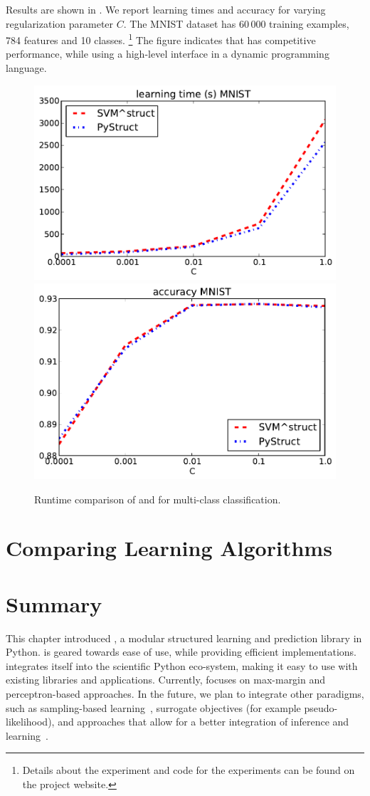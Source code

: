 Results are shown in . We report learning times and accuracy for
varying regularization parameter $C$. The MNIST dataset has 60\,000 training
examples, 784 features and 10 classes.%
\footnote{Details about the experiment and code for the experiments can be found on the project website.}
The figure indicates that \pystruct has competitive performance, while using
a high-level interface in a dynamic programming language.

\begin{figure}
\centering
\includegraphics[width=.45\textwidth]{times_MNIST}
\includegraphics[width=.45\textwidth]{accs_MNIST}
\caption{Runtime comparison of \pystruct and \svmstruct for multi-class
    classification.
}
\label{fig:timings}
\end{figure}

\section{Comparing Learning Algorithms}

\section{Summary}
This chapter introduced \pystruct, a modular structured learning and prediction library in Python.
\pystruct is geared towards ease of use, while providing efficient implementations.
\pystruct integrates itself into the scientific Python eco-system, making it easy to use with
existing libraries and applications.
Currently, \pystruct focuses on max-margin and perceptron-based approaches. In the future,
we plan to integrate other paradigms, such as sampling-based learning~\citep{wick2011samplerank},
surrogate objectives (for example pseudo-likelihood), and approaches that allow for a better integration
of inference and learning~\citep{meshi2010learning}.
